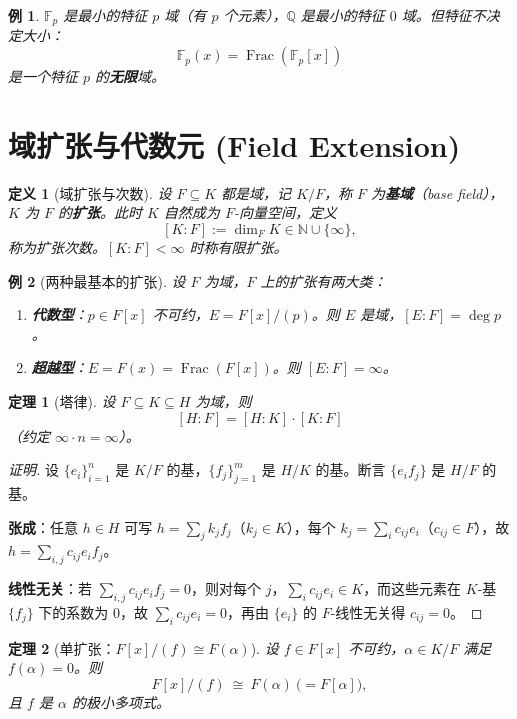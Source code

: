 \documentclass[11pt,a4paper]{ctexart}
\newtheorem*{theorem}{定理}
\newtheorem*{definition}{定义}
\newtheorem*{example}{例}
\theoremstyle{remark}
\DeclareMathOperator{\Frac}{Frac}
\newcommand{\Fp}{\mathbb{F}_p}
\begin{document}
\begin{example}
$\Fp$ 是最小的特征 $p$ 域（有 $p$ 个元素），$\mathbb{Q}$ 是最小的特征 $0$ 域。但特征不决定大小：
\[
\Fp(x)=\Frac(\Fp[x])
\]
是一个特征 $p$ 的\textbf{无限}域。
\end{example}

\section*{域扩张与代数元 (Field Extension)}

\begin{definition}[域扩张与次数]
设 $F\subseteq K$ 都是域，记 $K/F$，称 $F$ 为\textbf{基域}（base field），$K$ 为 $F$ 的\textbf{扩张}。此时 $K$ 自然成为 $F$-向量空间，定义
\[
[K:F]:=\dim_F K\in\mathbb{N}\cup\{\infty\} ,
\]
称为扩张次数。$[K:F]<\infty$ 时称有限扩张。
\end{definition}

\begin{example}[两种最基本的扩张]
设 $F$ 为域，$F$ 上的扩张有两大类：
\begin{enumerate}
    \item \textbf{代数型}：$p\in F[x]$ 不可约，$E=F[x]/(p)$。则 $E$ 是域，$[E:F]=\deg p$。
    \item \textbf{超越型}：$E=F(x)=\Frac(F[x])$。则 $[E:F]=\infty$。
\end{enumerate}
\end{example}

\begin{theorem}[塔律]
设 $F\subseteq K\subseteq H$ 为域，则
\[
[H:F]=[H:K]\cdot[K:F]
\]
（约定 $\infty\cdot n=\infty$）。
\end{theorem}

\begin{proof}[证明]
设 $\{e_i\}_{i=1}^{n}$ 是 $K/F$ 的基，$\{f_j\}_{j=1}^{m}$ 是 $H/K$ 的基。断言 $\{e_if_j\}$ 是 $H/F$ 的基。

\textbf{张成}：任意 $h\in H$ 可写 $h=\sum_j k_jf_j$（$k_j\in K$），每个 $k_j=\sum_i c_{ij}e_i$（$c_{ij}\in F$），故 $h=\sum_{i,j}c_{ij}e_if_j$。

\textbf{线性无关}：若 $\sum_{i,j}c_{ij}e_if_j=0$，则对每个 $j$，$\sum_i c_{ij}e_i\in K$，而这些元素在 $K$-基 $\{f_j\}$ 下的系数为 $0$，故 $\sum_i c_{ij}e_i=0$，再由 $\{e_i\}$ 的 $F$-线性无关得 $c_{ij}=0$。
\end{proof}

\begin{theorem}[{单扩张：$F[x]/(f)\cong F(\alpha)$}]
设 $f\in F[x]$ 不可约，$\alpha\in K/F$ 满足 $f(\alpha)=0$。则
\[
F[x]/(f)\ \cong\ F(\alpha)\ \bigl(=F[\alpha]\bigr),
\]
且 $f$ 是 $\alpha$ 的极小多项式。
\end{theorem}
\end{document}
